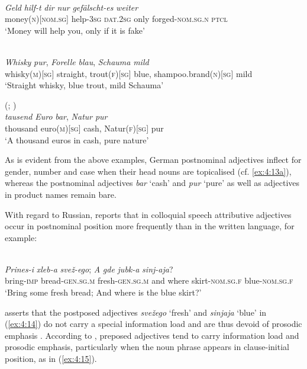 \ea

\ea{\label{ex:4:13a}}
\citep[234]{eisenberg-satz-1999}\\
\gll \textit{Geld} \textit{hilf-t} \textit{dir} \textit{nur} \textit{gefälscht-es} \textit{weiter}\\
	money(\textsc{n})[\textsc{nom.sg}] help-\textsc{3sg} \textsc{dat.2sg} only forged-\textsc{nom.sg.n} \textsc{ptcl}\\
\glt `Money will help you, only if it is fake'

\ex{\label{ex:4:13b}}
\citep[64, 78]{duerscheid-2002}\\
\gll \textit{Whisky} \textit{pur}, \textit{Forelle} \textit{blau}, \textit{Schauma} \textit{mild}\\
	whisky(\textsc{m})[\textsc{sg}] straight, trout(\textsc{f})[\textsc{sg}] blue, shampoo.brand(\textsc{n})[\textsc{sg}] mild\\
\glt `Straight whisky, blue trout, mild Schauma'

\ex{\label{ex:4:13c}}
(\citealt[350]{duden-2009}; \citealt[67]{duerscheid-2002})\\
\gll \textit{tausend} \textit{Euro} \textit{bar}, \textit{Natur} \textit{pur}\\
	thousand euro(\textsc{m})[\textsc{sg}] cash, Natur(\textsc{f})[\textsc{sg}] pur\\
\glt `A thousand euros in cash, pure nature'
\z
\z

\noindent As is evident from the above examples, German postnominal adjectives inflect for gender, number and case when their head nouns are topicalised (cf. \ref{ex:4:13a}), whereas the postnominal adjectives \textit{bar} `cash' and \textit{pur} `pure' as well as adjectives in product names remain bare.

With regard to Russian, \citet[149]{zemskaja} reports that in colloquial speech attributive adjectives occur in postnominal position more frequently than in the written language, for example: 

\ea
\label{ex:4:14}
\citep[152]{zemskaja}\\
\gll \textit{Prines-i} \textit{xleb-a} \textit{svež-ego}; \textit{A} \textit{gde} \textit{jubk-a} \textit{sinj-aja}?\\
	bring-\textsc{imp} bread-\textsc{gen.sg.m} fresh-\textsc{gen.sg.m} and where skirt-\textsc{nom.sg.f} blue-\textsc{nom.sg.f}\\
\glt `Bring some fresh bread; And where is the blue skirt?'
\z

\noindent \citet{zemskaja} asserts that the postposed adjectives \textit{svežego} `fresh' and \textit{sinjaja} `blue' in (\ref{ex:4:14}) do not carry a special information load and are thus devoid of prosodic emphasis \citep[cf.][208--212]{lapteva}. According to \citet{zemskaja}, preposed adjectives tend to carry information load and prosodic emphasis, particularly when the noun phrase appears in clause-initial position, as in (\ref{ex:4:15}).

